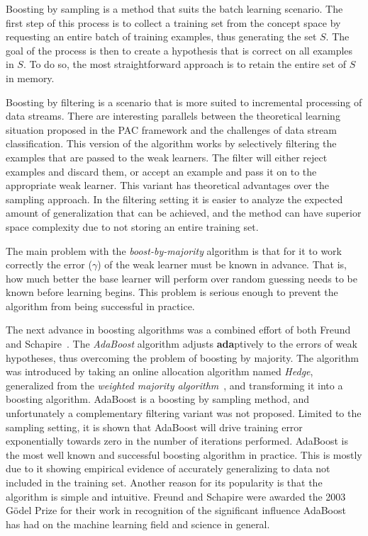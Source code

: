 Boosting by sampling is a method that suits the batch learning scenario. The first step of this process is to collect a training set from the concept space by requesting an entire batch of training examples, thus generating the set $S$. The goal of the process is then to create a hypothesis that is correct on all examples in $S$.
To do so, the most straightforward approach is to retain the entire set of $S$ in memory.

Boosting by filtering is a scenario that is more suited to incremental processing of data streams. There are interesting parallels between the theoretical learning situation proposed in the PAC framework and the challenges of data stream classification. This version of the algorithm works by selectively filtering the examples that are passed to the weak learners. The filter will either reject examples and discard them, or accept an example and pass it on to the appropriate weak learner. This variant has theoretical advantages over the sampling approach. In the filtering setting it is easier to analyze the expected amount of generalization that can be achieved, and the method can have superior space complexity due to not storing an entire training set.

The main problem with the {\em boost-by-majority} algorithm is that for it to work correctly the error ($\gamma$) of the weak learner must be known in advance. That is, how much better the base learner will perform over random guessing needs to be known before learning begins. This problem is serious enough to prevent the algorithm from being successful in practice.

The next advance in boosting algorithms was a combined effort of both Freund and Schapire~\cite{adaboost}. The {\em AdaBoost} algorithm adjusts {\bf ada}ptively to the errors of weak hypotheses, thus overcoming the problem of boosting by majority. The algorithm was introduced by taking an online allocation algorithm named {\em Hedge}, generalized from the {\em weighted majority algorithm}~\cite{wma}, and transforming it into a boosting algorithm. AdaBoost is a boosting by sampling method, and unfortunately a complementary filtering variant was not proposed. Limited to the sampling setting, it is shown that AdaBoost will drive training error exponentially towards zero in the number of iterations performed. AdaBoost is the most well known and successful boosting algorithm in practice. This is mostly due to it showing empirical evidence of accurately generalizing to data not included in the training set. Another reason for its popularity is that the algorithm is simple and intuitive. Freund and Schapire were awarded the 2003 G\"odel Prize for their work in recognition of the significant influence AdaBoost has had on the machine learning field and science in general.

